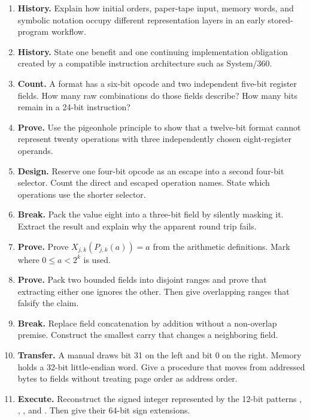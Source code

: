 \begin{enumerate}
\item \textbf{History.} Explain how initial orders, paper-tape input, memory
words, and symbolic notation occupy different representation layers in an
early stored-program workflow.

\item \textbf{History.} State one benefit and one continuing implementation
obligation created by a compatible instruction architecture such as
System/360.

\item \textbf{Count.} A format has a six-bit opcode and two independent
five-bit register fields. How many raw combinations do those fields describe?
How many bits remain in a 24-bit instruction?

\item \textbf{Prove.} Use the pigeonhole principle to show that a twelve-bit
format cannot represent twenty operations with three independently chosen
eight-register operands.

\item \textbf{Design.} Reserve one four-bit opcode as an escape into a second
four-bit selector. Count the direct and escaped operation names. State which
operations use the shorter selector.

\item \textbf{Break.} Pack the value eight into a three-bit field by silently
masking it. Extract the result and explain why the apparent round trip fails.

\item \textbf{Prove.} Prove
\(X_{j,k}(P_{j,k}(a))=a\) from the arithmetic definitions. Mark where
\(0\leq a<2^k\) is used.

\item \textbf{Prove.} Pack two bounded fields into disjoint ranges and prove
that extracting either one ignores the other. Then give overlapping ranges
that falsify the claim.

\item \textbf{Break.} Replace field concatenation by addition without a
non-overlap premise. Construct the smallest carry that changes a neighboring
field.

\item \textbf{Transfer.} A manual draws bit 31 on the left and bit 0 on the
right. Memory holds a 32-bit little-endian word. Give a procedure that moves
from addressed bytes to fields without treating page order as address order.

\item \textbf{Execute.} Reconstruct the signed integer represented by the
12-bit patterns , , , and . Then give
their 64-bit sign extensions.


\end{enumerate}
